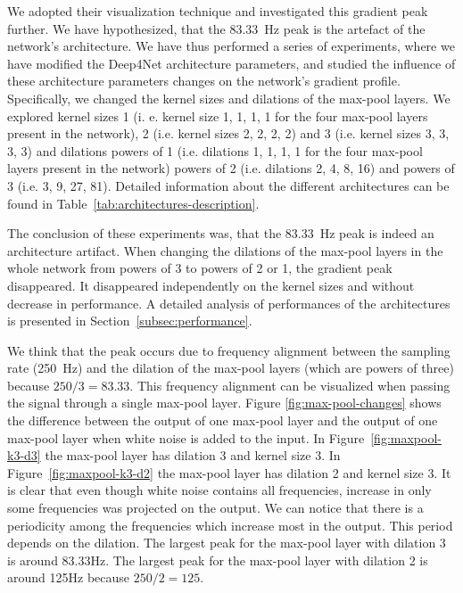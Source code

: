 We adopted their visualization technique and investigated this gradient peak further. We have hypothesized, that the 83.33~Hz peak is the artefact of the network's architecture. We have thus 
performed a series of experiments, where we have modified the Deep4Net architecture parameters, and 
studied the influence of these architecture parameters changes on the network's gradient profile.
Specifically, we changed the kernel sizes and dilations of the max-pool layers. We explored kernel sizes 1 (i. e. kernel size 1, 1, 1, 1 for the four max-pool layers present in the network), 2 (i.e. kernel sizes 2, 2, 2, 2) and 3 (i.e. kernel sizes 3, 3, 3, 3) and dilations powers of 1 (i.e. dilations 1, 1, 1, 1  for the four max-pool layers present in the network) powers of 2 (i.e. dilations 2, 4, 8, 16) and powers of 3 (i.e. 3, 9, 27, 81). Detailed information about the different architectures can be found in Table~\ref{tab:architectures-description}.

The conclusion of these experiments was, that the 83.33~Hz peak is indeed an architecture artifact. When changing the dilations of the max-pool layers in the whole network from powers of 3 to powers of 2 or 1, the gradient peak disappeared. It disappeared independently on the kernel sizes and without decrease in performance. A detailed analysis of performances of the architectures is presented in Section~\ref{subsec:performance}. 

We think that the peak occurs due to frequency alignment between the sampling rate (250~Hz) and the dilation of the max-pool layers (which are powers of three) because $ 250/3 = 83.33$. This frequency alignment can be visualized when passing the signal through a single max-pool layer. Figure \ref{fig:max-pool-changes} shows the difference between the output of one max-pool layer and the output of one max-pool layer when white noise is added to the input. In Figure~\ref{fig:maxpool-k3-d3} the max-pool layer has dilation 3 and kernel size 3. In Figure~\ref{fig:maxpool-k3-d2} the max-pool layer has dilation 2 and kernel size 3. It is clear that even though white noise contains all frequencies, increase in only some frequencies was projected on the output. We can notice that there is a periodicity among the frequencies which increase most in the output.
This period depends on the dilation. The largest peak for the max-pool layer with dilation 3 is around 83.33Hz. The largest peak for the max-pool layer with dilation 2 is around 125Hz because $250/2 = 125$. 

